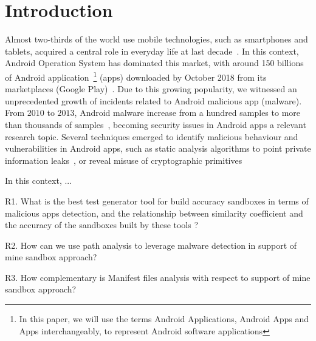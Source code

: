 \section{Introduction}\label{sec:introduction}

Almost two-thirds of the world use mobile technologies, such as smartphones and tablets, acquired a central role in everyday life at last decade~\cite{Comscore}\cite{DBLP:journals/tse/MartinSJZH17}. In this context, Android Operation System has dominated this market, with around 150 billions of Android application~\footnote{In this paper, we will use the terms Android Applications, Android Apps and Apps interchangeably, to represent Android software applications} (apps) downloaded by October 2018 from its marketplaces (Google Play)~\cite{Statista}. Due to this growing popularity, we witnessed an unprecedented growth of incidents related to Android malicious app (malware). From $2010$ to $2013$, Android malware increase from a hundred samples to more than thousands of samples~\cite{DBLP:journals/comsur/FarukiBLGGCR15,DBLP:journals/csur/SufatrioTCT15}, becoming security issues in Android apps a relevant research topic. Several techniques emerged to identify malicious behaviour and vulnerabilities in Android apps, such as static analysis algorithms to point private information leaks~\cite{DBLP:conf/pldi/ArztRFBBKTOM14}, or reveal misuse of 
cryptographic primitives~\cite{DBLP:journals/tse/KrugerSABM21}

In this context, ...




R1. What is the best test generator tool for build accuracy sandboxes in terms of malicious apps detection, and the relationship between similarity coefficient and the accuracy of the sandboxes built by these tools ?

R2. How can we use path analysis to leverage malware detection in support of mine sandbox approach?

R3. How complementary is Manifest files analysis with respect to support of mine sandbox approach?